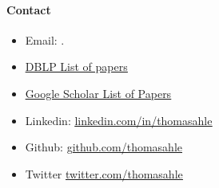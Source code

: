 \documentclass[11pt]{article}
\begin{document}
\paragraph{Contact}
\begin{itemize}
   \item[]
      Email: \href{mailto:\VAR{authors['thdy'].email}}{}.
   \item[]
      \href{https://dblp1.uni-trier.de/pers/hd/a/Ahle:Thomas_D=}{\underline{DBLP List of papers}}
   \item[]
      \href{https://scholar.google.dk/citations?user=aRiVoYgAAAAJ}{\underline{Google Scholar List of Papers}}
   \item[]
      Linkedin: \href{https://www.linkedin.com/in/thomasahle/}{\underline{linkedin.com/in/thomasahle}}
   \item[]
      Github: \href{https://github.com/thomasahle}{\underline{github.com/thomasahle}}
   \item[]
      Twitter \href{https://twitter.com/thomasahle}{\underline{twitter.com/thomasahle}}
\end{itemize}
\end{document}
